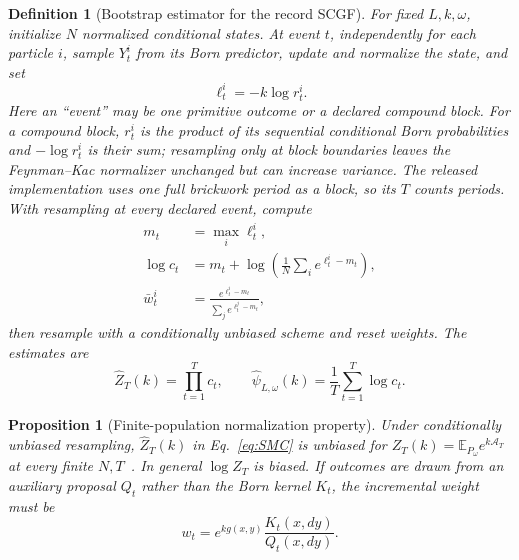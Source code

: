 \documentclass[aps,prx,reprint,superscriptaddress,nobibnotes,longbibliography]{revtex4-2}
\newtheorem{proposition}{Proposition}
\newtheorem{definition}{Definition}
\theoremstyle{remark}
\newcommand{\E}{\mathbb E}
\begin{document}
\begin{definition}[Bootstrap estimator for the record SCGF]
For fixed $L,k,\omega$, initialize $N$ normalized conditional states.  At event $t$, independently for each particle $i$, sample $Y_t^i$ from its Born predictor, update and normalize the state, and set
\begin{equation}
 \ell_t^i=-k\log r_t^i.
\end{equation}
Here an ``event'' may be one primitive outcome or a declared compound block.  For a compound block, $r_t^i$ is the product of its sequential conditional Born probabilities and $-\log r_t^i$ is their sum; resampling only at block boundaries leaves the Feynman--Kac normalizer unchanged but can increase variance.  The released implementation uses one full brickwork period as a block, so its $T$ counts periods.  With resampling at every declared event, compute
\begin{align}
 m_t&=\max_i\ell_t^i,\\
 \log c_t&=m_t+\log\left(\frac1N\sum_i e^{\ell_t^i-m_t}\right),\\
 \bar w_t^i&=\frac{e^{\ell_t^i-m_t}}{\sum_j e^{\ell_t^j-m_t}},
\end{align}
then resample with a conditionally unbiased scheme and reset weights.  The estimates are
\begin{equation}
 \widehat Z_T(k)=\prod_{t=1}^Tc_t,\qquad
 \widehat\psi_{L,\omega}(k)=\frac1T\sum_{t=1}^T\log c_t.
 \label{eq:SMC}
\end{equation}
\end{definition}

\begin{proposition}[Finite-population normalization property]
\label{prop:SMC}
Under conditionally unbiased resampling, $\widehat Z_T(k)$ in Eq.~\eqref{eq:SMC} is unbiased for $Z_T(k)=\E_{P_\omega}e^{k\mathcal A_T}$ at every finite $N,T$~\cite{DelMoral2004}.  In general $\log\widehat Z_T$ is biased.  If outcomes are drawn from an auxiliary proposal $Q_t$ rather than the Born kernel $K_t$, the incremental weight must be
\begin{equation}
 w_t=e^{kg(x,y)}\frac{K_t(x,dy)}{Q_t(x,dy)}.
 \label{eq:RN}
\end{equation}
\end{proposition}
\end{document}
